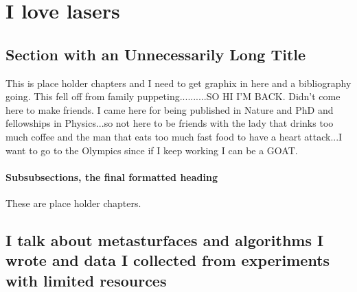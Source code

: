 \chapter{I love lasers}



\section[I love waves]{Section with an Unnecessarily Long Title}

This is place holder chapters and I need to get graphix in here and a bibliography going. This fell off from family puppeting..........SO HI I'M BACK. Didn't come here to make friends. I came here for being published in Nature and PhD and fellowships in Physics...so not here to be friends with the lady that drinks too much coffee and the man that eats too much fast food to have a heart attack...I want to go to the Olympics since if I keep working I can be a GOAT.  

\subsubsection{Subsubsections, the final formatted heading}

These are place holder chapters. 

\section{I talk about metasturfaces and algorithms I wrote and data I collected from experiments with limited resources}

